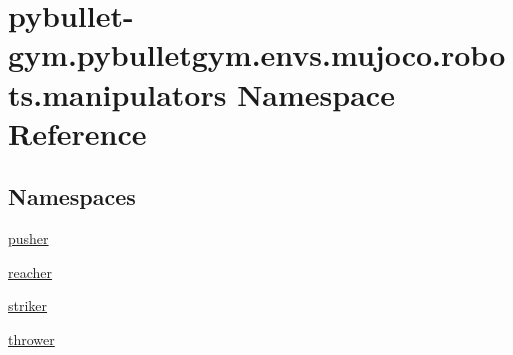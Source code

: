 \hypertarget{namespacepybullet-gym_1_1pybulletgym_1_1envs_1_1mujoco_1_1robots_1_1manipulators}{}\section{pybullet-\/gym.pybulletgym.\+envs.\+mujoco.\+robots.\+manipulators Namespace Reference}
\label{namespacepybullet-gym_1_1pybulletgym_1_1envs_1_1mujoco_1_1robots_1_1manipulators}
\subsection*{Namespaces}
\begin{DoxyCompactItemize}
\item 
 \hyperlink{namespacepybullet-gym_1_1pybulletgym_1_1envs_1_1mujoco_1_1robots_1_1manipulators_1_1pusher}{pusher}
\item 
 \hyperlink{namespacepybullet-gym_1_1pybulletgym_1_1envs_1_1mujoco_1_1robots_1_1manipulators_1_1reacher}{reacher}
\item 
 \hyperlink{namespacepybullet-gym_1_1pybulletgym_1_1envs_1_1mujoco_1_1robots_1_1manipulators_1_1striker}{striker}
\item 
 \hyperlink{namespacepybullet-gym_1_1pybulletgym_1_1envs_1_1mujoco_1_1robots_1_1manipulators_1_1thrower}{thrower}
\end{DoxyCompactItemize}
